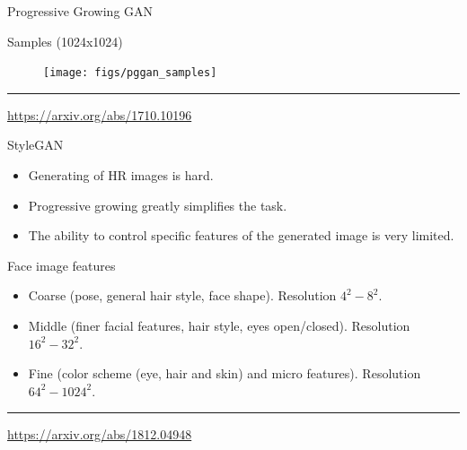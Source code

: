 \documentclass{beamer}
\begin{document}
\begin{frame}{Progressive Growing GAN}
	\begin{block}{Samples (1024x1024)}
		\begin{figure}
			\centering
			\texttt{[image: figs/pggan\_samples]}
		\end{figure}
	\end{block}
	\vfill
	\hrule\medskip 
	{\scriptsize \href{https://arxiv.org/abs/1710.10196}{https://arxiv.org/abs/1710.10196}}
\end{frame}
\begin{frame}{StyleGAN}
	\begin{itemize}
		\item Generating of HR images is hard.
		\item Progressive growing greatly simplifies the task.
		\item The ability to control specific features of the generated image is very limited.
	\end{itemize}
	\begin{block}{Face image features}
		\begin{itemize}
			\item Coarse (pose, general hair style, face shape). Resolution $4^2 - 8^2$.
			\item Middle (finer facial features, hair style, eyes open/closed). Resolution $16^2 - 32^2$.
			\item Fine (color scheme (eye, hair and skin) and micro features). Resolution $64^2 - 1024^2$.
		\end{itemize}
	\end{block}
	\vfill
	\hrule\medskip 
	{\scriptsize \href{https://arxiv.org/abs/1812.04948}{https://arxiv.org/abs/1812.04948}}
\end{frame}
\end{document}
